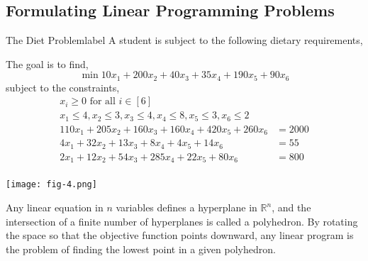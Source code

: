 \subsection{Formulating Linear Programming Problems}
	\begin{ex}{The Diet Problem}{label}
		A student is subject to the following dietary requirements,

		\vphantom{.}


		\vphantom{.}

		\noindent The goal is to find,
		\[\min 10x_1 + 200x_2 + 40x_3 + 35x_4 + 190x_5 + 90x_6 \]
		\noindent subject to the constraints,
		\begin{align*}
			x_i \geq 0 \text{ for all $i \in [6]$} & \\
			x_1 \leq 4, x_2 \leq 3, x_3 \leq 4, x_4 \leq 8, x_5 \leq 3, x_6 \leq 2 & \\
			110x_1 + 205x_2 + 160x_3 + 160x_4 + 420x_5 + 260x_6 &= 2000 \\
			4x_1 + 32x_2 + 13x_3 + 8x_4 + 4x_5 + 14x_6 &= 55 \\
			2x_1 + 12x_2 + 54x_3 + 285x_4 + 22x_5 + 80x_6 &= 800 \\
		\end{align*}

	\end{ex}

	\begin{marginfigure}
		\begin{center}
			\texttt{[image: fig-4.png]}
		\end{center}

		\noindent Any linear equation in $n$ variables defines a hyperplane in $\mathbb{R}^n$, and the intersection of a finite number of hyperplanes is called a polyhedron. By rotating the space so that the objective function points downward, any linear program is the problem of finding the lowest point in a given polyhedron.
	\end{marginfigure}

